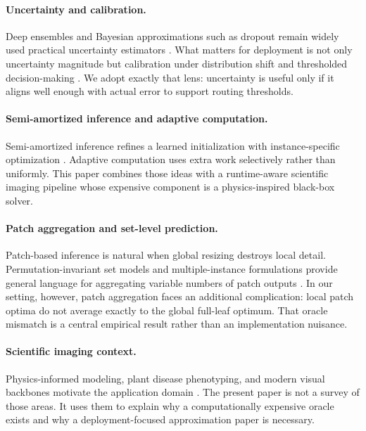\documentclass[11pt,a4paper]{article}
\begin{document}
\paragraph{Uncertainty and calibration.}
Deep ensembles and Bayesian approximations such as dropout remain widely used practical uncertainty estimators \citep{B_lakshminarayanan2017,B_gal2016}.
What matters for deployment is not only uncertainty magnitude but calibration under distribution shift and thresholded decision-making \citep{B_ovadia2019,B_guo2017}.
We adopt exactly that lens: uncertainty is useful only if it aligns well enough with actual error to support routing thresholds.

\paragraph{Semi-amortized inference and adaptive computation.}
Semi-amortized inference refines a learned initialization with instance-specific optimization \citep{B_kim2018,B_marino2018}.
Adaptive computation uses extra work selectively rather than uniformly.
This paper combines those ideas with a runtime-aware scientific imaging pipeline whose expensive component is a physics-inspired black-box solver.

\paragraph{Patch aggregation and set-level prediction.}
Patch-based inference is natural when global resizing destroys local detail.
Permutation-invariant set models and multiple-instance formulations provide general language for aggregating variable numbers of patch outputs \citep{B_zaheer2017,B_ilse2018}.
In our setting, however, patch aggregation faces an additional complication: local patch optima do not average exactly to the global full-leaf optimum.
That oracle mismatch is a central empirical result rather than an implementation nuisance.

\paragraph{Scientific imaging context.}
Physics-informed modeling, plant disease phenotyping, and modern visual backbones motivate the application domain \citep{B_raissi2019,B_mahlein2016,B_he2016,B_oquab2024}.
The present paper is not a survey of those areas.
It uses them to explain why a computationally expensive oracle exists and why a deployment-focused approximation paper is necessary.
\end{document}
